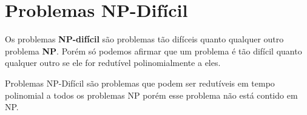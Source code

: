 \section{Problemas NP-Difícil}
Os problemas \textbf{NP-difícil} são problemas tão difíceis quanto qualquer outro problema \textbf{NP}. Porém só podemos afirmar que um problema é tão difícil quanto qualquer outro se ele for redutível polinomialmente a eles.

Problemas NP-Difícil são problemas que podem ser redutíveis em tempo polinomial a todos os problemas NP porém esse problema não está contido em NP.
